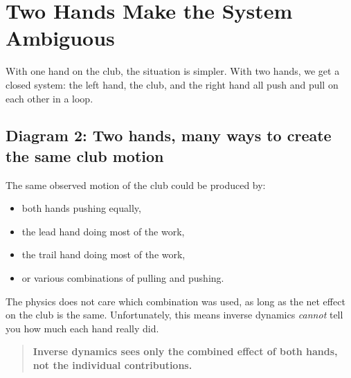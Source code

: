 \documentclass[12pt]{article}
\begin{document}
\section{Two Hands Make the System Ambiguous}

With one hand on the club, the situation is simpler.  
With two hands, we get a closed system: the left hand, the club, and the right hand all push and pull on each other in a loop.

\subsection*{Diagram 2: Two hands, many ways to create the same club motion}

\begin{center}
\end{center}

The same observed motion of the club could be produced by:
\begin{itemize}
    \item both hands pushing equally,
    \item the lead hand doing most of the work,
    \item the trail hand doing most of the work,
    \item or various combinations of pulling and pushing.
\end{itemize}

The physics does not care which combination was used, as long as the net effect on the club is the same.  
Unfortunately, this means inverse dynamics \emph{cannot} tell you how much each hand really did.

\begin{quote}
\textbf{Inverse dynamics sees only the combined effect of both hands, not the individual contributions.}
\end{quote}
\end{document}
